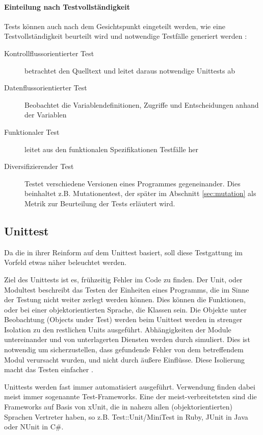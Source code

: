 \paragraph{Einteilung nach Testvollständigkeit} Tests können auch nach dem Gesichtspunkt eingeteilt werden, wie eine Testvollständigkeit beurteilt wird und notwendige Testfälle generiert werden \citep{liggesmeyer_modultest_1990}:
\begin{description}
 \item[Kontrollflussorientierter Test] betrachtet den Quelltext und leitet daraus notwendige Unittests ab
 \item[Datenflussorientierter Test] Beobachtet die Variablendefinitionen, Zugriffe und Entscheidungen anhand der Variablen
 \item[Funktionaler Test] leitet aus den funktionalen Spezifikationen Testfälle her
 \item[Diversifizierender Test] Testet verschiedene Versionen eines Programmes gegeneinander. Dies beinhaltet z.B. Mutationentest, der später im Abschnitt \ref{sec:mutation} \textit{} als Metrik zur Beurteilung der Tests erläutert wird.
\end{description}
\subsection{Unittest}
Da die  in ihrer Reinform auf dem Unittest basiert, soll diese Testgattung im Vorfeld etwas näher beleuchtet werden.

Ziel des Unittests ist es, frühzeitig Fehler im Code zu finden. Der Unit, oder Modultest beschreibt das Testen der Einheiten eines Programms, die im Sinne der Testung nicht weiter zerlegt werden können. Dies können die Funktionen, oder bei einer objektorientierten Sprache, die Klassen sein. Die Objekte unter Beobachtung (Objects under Test) werden beim Unittest werden in strenger Isolation zu den restlichen Units ausgeführt. Abhängigkeiten der Module untereinander und von unterlagerten Diensten werden durch  simuliert. Dies ist notwendig um sicherzustellen, dass gefundende Fehler von dem betreffendem Modul verursacht wurden, und nicht durch äußere Einflüsse. Diese Isolierung macht das Testen einfacher \citep{goodliffe_code_2006}.



Unittests werden fast immer automatisiert ausgeführt. Verwendung finden dabei meist immer sogenannte Test-Frameworks. Eine der meist-verbreitetsten sind die Frameworks auf Basis von xUnit, die in nahezu allen (objektorientierten) Sprachen Vertreter haben, so z.B. Test::Unit/MiniTest in Ruby, JUnit in Java oder NUnit in C\#.

